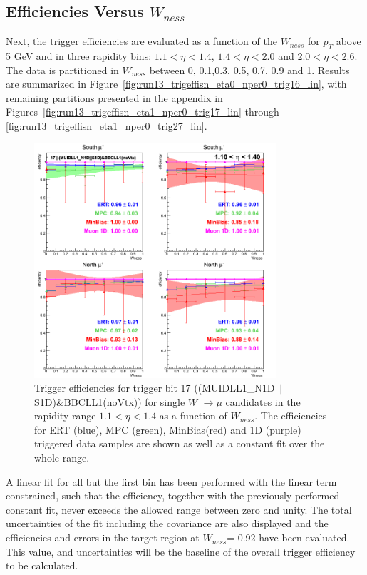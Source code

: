 \clearpage
\subsection{Efficiencies Versus $W_{ness}$}

Next, the trigger efficiencies are evaluated as a function of the $W_{ness}$ for
$p_T$ above 5 GeV and in three rapidity bins: $1.1 < \eta < 1.4$, $1.4 < \eta <
2.0$ and $2.0 < \eta < 2.6$. The data is partitioned in $W_{ness}$ between 0,
0.1,0.3, 0.5, 0.7, 0.9 and 1. Results are summarized in
Figure~\ref{fig:run13_trigeffisn_eta0_nper0_trig16_lin}, with remaining
partitions presented in the appendix in
Figures~\ref{fig:run13_trigeffisn_eta1_nper0_trig17_lin} through
\ref{fig:run13_trigeffisn_eta1_nper0_trig27_lin}.

\begin{figure}[ht]
  \centering
  \includegraphics[width=0.8\textwidth]{./figures/run13_trigeffisn_eta0_trig17_lin.png}
  \caption{
    Trigger efficiencies for trigger bit 17
    ((MUIDLL1\_N1D$\|$S1D)\&BBCLL1(noVtx)) for single $W$ $\rightarrow \mu$
    candidates in the rapidity range $ 1.1 < \eta < 1.4$ as a function of
    $W_{ness}$. The efficiencies for ERT (blue), MPC (green), MinBias(red) and
    1D (purple) triggered data samples are shown as well as a constant fit over
    the whole range.
  }
  \label{fig:run13_trigeffisn_eta0_nper0_trig17_lin} 
\end{figure}

A linear fit for all but the first bin has been performed with the linear term
constrained, such that the efficiency, together with the previously performed
constant fit, never exceeds the allowed range between zero and unity. The total
uncertainties of the fit including the covariance are also displayed and the
efficiencies and errors in the target region at $W_{ness}$= 0.92 have been
evaluated.  This value, and uncertainties will be the baseline of the overall
trigger efficiency to be calculated.

